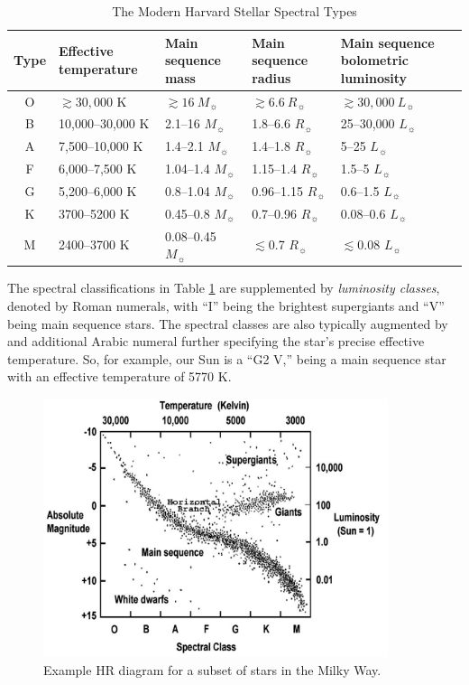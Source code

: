 \begin{table}[hbt]
  \caption{The Modern Harvard Stellar Spectral Types}\label{t.spectralclass}
  \begin{tabular}{c|p{}p{}p{}p{}}
  \hline
  Type & Effective temperature & Main sequence mass & Main sequence radius & Main sequence bolometric luminosity \\
  \hline\hline
  O & $\gtrsim30,000$ K & $\gtrsim16\ M_\sun$ & $\gtrsim6.6\ R_\sun$ & $\gtrsim30,000\ L_\sun$ \\
  B & 10,000--30,000 K & 2.1--16 $M_\sun$ & 1.8--6.6 $R_\sun$ & 25--30,000 $L_\sun$ \\
  A & 7,500--10,000 K & 1.4--2.1 $M_\sun$ & 1.4--1.8 $R_\sun$ & 5--25 $L_\sun$ \\
  F & 6,000--7,500 K & 1.04--1.4 $M_\sun$ & 1.15--1.4 $R_\sun$ & 1.5--5 $L_\sun$ \\
  G & 5,200--6,000 K & 0.8--1.04 $M_\sun$ & 0.96--1.15 $R_\sun$ & 0.6--1.5 $L_\sun$ \\
  K & 3700--5200 K & 0.45--0.8 $M_\sun$ & 0.7--0.96 $R_\sun$ & 0.08--0.6 $L_\sun$ \\
  M & 2400--3700 K & 0.08--0.45 $M_\sun$ & $\lesssim$0.7 $R_\sun$ & $\lesssim$0.08 $L_\sun$ \\
  \hline
  \end{tabular}
\end{table}

The spectral classifications in Table \ref{t.spectralclass} are supplemented by {\it luminosity classes}, denoted by Roman numerals, with ``I'' being the brightest supergiants and ``V'' being main sequence stars.
The spectral classes are also typically augmented by and additional Arabic numeral further specifying the star's precise effective temperature.
So, for example, our Sun is a ``G2 V,'' being a main sequence star with an effective temperature of 5770 K.

\begin{figure}[htb]
  \includegraphics[width=0.9\textwidth]{prelim/HR_diagram}
  \caption{Example HR diagram for a subset of stars in the Milky Way.}
  \label{f.hrd}
\end{figure}

